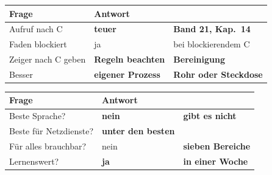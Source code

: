\begin{aufgabe}
\begin{center}
{\small
\renewcommand{\arraystretch}{1.5}
\begin{tabular}{@{}P{2.8cm}P{2.6cm}P{2.6cm}@{}}
\toprule
\textbf{Frage} & \textbf{Antwort} & \\
\midrule
Aufruf nach C & \textcolor{akzent}{\textbf{teuer}} & \textbf{Band 21, Kap.~14}\\
Faden blockiert & \textcolor{akzent}{ja} & \textcolor{akzent}{bei blockierendem C}\\
Zeiger nach C geben & \textcolor{akzent}{\textbf{Regeln beachten}} & \textcolor{akzent}{\textbf{Bereinigung}}\\
Besser & \textbf{eigener Prozess} & \textcolor{gruen}{\textbf{Rohr oder Steckdose}}\\
\bottomrule
\end{tabular}}
\end{center}

\begin{center}
\begin{minipage}{0.88\textwidth}
\end{minipage}
\end{center}

\begin{center}
\end{center}

\begin{warnung}
\begin{center}
\renewcommand{\arraystretch}{1.5}
\begin{tabular}{@{}P{3.0cm}P{2.2cm}P{2.6cm}@{}}
\toprule
\textbf{Frage} & \textbf{Antwort} & \\
\midrule
Beste Sprache? & \textcolor{akzent}{\textbf{nein}} & \textbf{gibt es nicht}\\
Beste für Netzdienste? & \textcolor{gruen}{\textbf{unter den besten}} & \\
Für alles brauchbar? & \textcolor{akzent}{nein} & \textbf{sieben Bereiche}\\
Lernenswert? & \textcolor{gruen}{\textbf{ja}} & \textcolor{gruen}{\textbf{in einer Woche}}\\
\bottomrule
\end{tabular}
\end{center}


\end{warnung}
\end{aufgabe}
